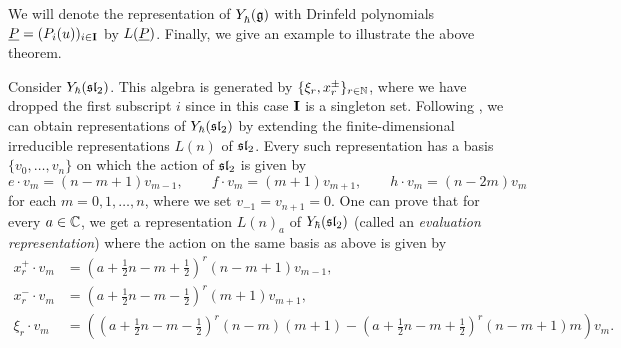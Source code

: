 We will denote the representation of $Y_\hbar^{}(\mathfrak{g})$ with Drinfeld polynomials $\underline{P} = (P_i(u))_{i\in\mathbf{I}}$ by $L(\underline{P})$.
Finally, we give an example to illustrate the above theorem.

\begin{example}\label{E:Y(sl2)}
    Consider $Y_\hbar(\mathfrak{sl}_2)$.
    This algebra is generated by $\{\xi_r,x^\pm_r\}_{r\in\mathbb{N}}$, where we have dropped the first subscript $i$ since in this case $\mathbf{I}$ is a singleton set.
    Following \cite[\S 12.1]{chari_guide_1995}, we can obtain representations of $Y_\hbar(\mathfrak{sl}_2)$ by extending the finite-dimensional irreducible representations $L(n)$ of $\mathfrak{sl}_2$.
    Every such representation has a basis $\{v_0,\dots,v_n\}$ on which the action of $\mathfrak{sl}_2$ is given by
    \[e\cdot v_m = (n-m+1)v_{m-1}, \qquad f\cdot v_m = (m+1)v_{m+1}, \qquad h\cdot v_m = (n-2m)v_m\]
    for each $m=0,1,\dots,n$, where we set $v_{-1}=v_{n+1}=0$.
    One can prove that for every $a\in\mathbb{C}$, we get a representation $L(n)_a$ of $Y_\hbar(\mathfrak{sl}_2)$ (called an \emph{evaluation representation}) where the action on the same basis as above is given by
    \begin{align*}
        x^+_r\cdot v_m &= \left(a+\frac{1}{2}n-m+\frac{1}{2}\right)^r(n-m+1)v_{m-1}, \\
        x^-_r\cdot v_m &= \left(a+\frac{1}{2}n-m-\frac{1}{2}\right)^r(m+1)v_{m+1}, \\
        \xi_r\cdot v_m &= \left(\left(a+\frac{1}{2}n-m-\frac{1}{2}\right)^r(n-m)(m+1) -\left(a+\frac{1}{2}n-m+\frac{1}{2}\right)^r(n-m+1)m\right) v_m.
    \end{align*}


\end{example}
